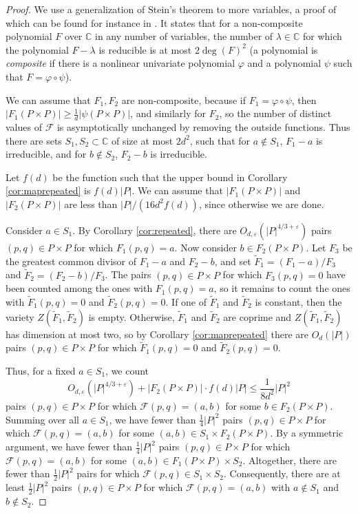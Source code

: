 \documentclass{daj}
\theoremstyle{definition}
\newcommand{\C}{\mathbb C}
\newcommand{\eps}{\varepsilon}
\begin{document}
\begin{proof}
We use a generalization of Stein's theorem \cite{St} to more variables, a proof of which can be found for instance in \cite{B}.
It states that for a non-composite polynomial $F$ over $\C$ in any number of variables, the number of $\lambda\in \C$ for which the polynomial $F-\lambda$ is reducible is at most $2\deg(F)^2$ (a polynomial is \emph{composite} if there is a nonlinear univariate polynomial $\varphi$ and a polynomial $\psi$ such that $F = \varphi\circ \psi$).

We can assume that $F_1,F_2$ are non-composite, because if $F_1 = \varphi\circ \psi$, then $|F_1(P\times P)|\geq \frac{1}{d}|\psi(P\times P)|$, and similarly for $F_2$, so the number of distinct values of $\mathcal{F}$ is asymptotically unchanged by removing the outside functions.
Thus there are sets $S_1,S_2\subset \C$ of size at most $2d^2$, such that for $a\not\in S_1$, $F_1-a$ is irreducible, and for $b\not\in S_2$, $F_2-b$ is irreducible.

Let $f(d)$ be the function such that the upper bound in Corollary \ref{cor:maprepeated} is $f(d)|P|$.
We can assume that $|F_1(P\times P)|$ and $|F_2(P\times P)|$ are less than $|P|/(16d^2f(d))$, since otherwise we are done.

Consider $a\in S_1$.
By Corollary \ref{cor:repeated}, 
there are $O_{d,\eps}(|P|^{4/3+\eps})$ pairs $(p,q)\in P\times P$ for which $F_1(p,q)=a$.
Now consider $b\in  F_2(P\times P)$.
Let $F_3$ be the greatest common divisor of $F_1-a$ and $F_2-b$, and set $\widetilde{F}_1 = (F_1-a)/F_3$ and $\widetilde{F}_2=(F_2-b)/F_3$.
The pairs $(p,q)\in P\times P$ for which $F_3(p,q)=0$ have been counted among the ones with $F_1(p,q)=a$, so it remains to count the ones with $\widetilde{F}_1(p,q)=0$ and $\widetilde{F}_2(p,q)=0$.
If one of $\widetilde{F}_1 $ and $\widetilde{F}_2$ is constant, then the variety $Z(\widetilde{F}_1,\widetilde{F}_2)$ is empty.
Otherwise, $\widetilde{F}_1 $ and $\widetilde{F}_2$ are coprime and $Z(\widetilde{F}_1,\widetilde{F}_2)$ has dimension at most two,  
so by Corollary \ref{cor:maprepeated} there are $O_d(|P|)$ pairs $(p,q)\in P\times P$ for which $\widetilde{F}_1(p,q) =0$ and $\widetilde{F}_2(p,q)=0$.

Thus, 
for a fixed $a\in S_1$, we count 
\[O_{d,\eps}(|P|^{4/3+\eps}) + |F_2(P\times P)|\cdot f(d)|P| \leq \frac{1}{8d^2}|P|^2\]
pairs $(p,q)\in P\times P$ for which $\mathcal{F}(p,q) = (a,b)$ for some $b\in F_2(P\times P)$.
Summing over all $a\in S_1$, 
we have fewer than $\frac{1}{4}|P|^2$ pairs $(p,q)\in P\times P$ for which $\mathcal{F}(p,q) = (a,b)$ for some $(a,b)\in S_1\times F_2(P\times P)$.
By a symmetric argument, 
we have fewer than $\frac{1}{4}|P|^2$ pairs $(p,q)\in P\times P$ for which $\mathcal{F}(p,q) = (a,b)$ for some $(a,b)\in F_1(P\times P)\times S_2$.
Altogether, there are fewer than $\frac{1}{2}|P|^2$ pairs for which $\mathcal{F}(p,q)\in S_1\times S_2$.
Consequently, there are at least $\frac{1}{2}|P|^2$ pairs $(p,q)\in P\times P$ for which $\mathcal{F}(p,q) = (a,b)$ with $a\not\in S_1$ and $b\not\in S_2$.


\end{proof}
\end{document}

